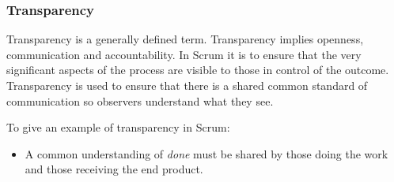 \subsubsection{Transparency}

Transparency is a generally defined term. Transparency implies openness, communication and
accountability. In Scrum it is to ensure that the very significant aspects of the process 
are visible to those in control of the outcome. Transparency is used 
to ensure that there is a shared common standard of communication so observers understand 
what they see\cite{scrumguide11}.

To give an example of transparency in Scrum:

\begin{itemize}
	\item A common understanding of \textit{done} must be shared by those doing the work and 
those receiving the end product\cite{scrumguide11}.
\end{itemize}